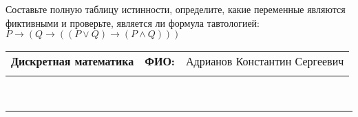 \documentclass[10pt]{exam}
\newcommand{\class}{Дискретная математика}
\newcommand{\examdate}{}
\begin{document}
\begin{questions}
\begin{enumerate} [a)]
\end{enumerate}\question Составьте полную таблицу истинности, определите, какие переменные являются фиктивными и проверьте, является ли формула тавтологией:
$ P \rightarrow (Q \rightarrow ((P \lor Q) \rightarrow (P \land Q)))$

\end{questions}
\newpage
\begin{flushright}
\begin{tabular}{p{2.8in} r l}
\textbf{\class} & \textbf{ФИО:} &Адрианов Константин Сергеевич
\\

\textbf{\examdate} &&\\
\end{tabular}\\
\end{flushright}
\rule[1ex]{\textwidth}{.1pt}
\end{document}
